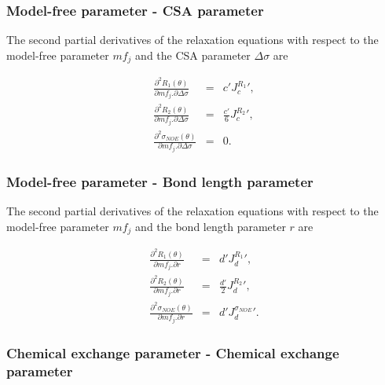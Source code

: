\subsubsection{Model-free parameter - CSA parameter}

The second partial derivatives of the relaxation equations with respect to the model-free parameter $mf_j$ and the CSA parameter $\Delta\sigma$ are

\begin{eqnarray}
    \frac{\partial^2 R_1(\theta)}{\partial mf_j . \partial \Delta\sigma} & = & c' {J_c^{R_1}}',             \label{eq: Ri': d2R1/dmfj.dCSA} \\
    \frac{\partial^2 R_2(\theta)}{\partial mf_j . \partial \Delta\sigma} & = & \frac{c'}{6} {J_c^{R_2}}',   \label{eq: Ri': d2R2/dmfj.dCSA} \\
    \frac{\partial^2 \sigma_{NOE}(\theta)}{\partial mf_j . \partial \Delta\sigma} & = & 0.                  \label{eq: Ri': d2sigmaNOE/dmfj.dCSA}
\end{eqnarray}


\subsubsection{Model-free parameter - Bond length parameter}

The second partial derivatives of the relaxation equations with respect to the model-free parameter $mf_j$ and the bond length parameter $r$ are

\begin{eqnarray}
    \frac{\partial^2 R_1(\theta)}{\partial mf_j . \partial r} & = & d' {J_d^{R_1}}',                    \label{eq: Ri': d2R1/dmfj.dr} \\
    \frac{\partial^2 R_2(\theta)}{\partial mf_j . \partial r} & = & \frac{d'}{2} {J_d^{R_2}}',          \label{eq: Ri': d2R2/dmfj.dr} \\
    \frac{\partial^2 \sigma_{NOE}(\theta)}{\partial mf_j . \partial r} & = & d' {J_d^{\sigma_{NOE}}}'.  \label{eq: Ri': d2sigmaNOE/dmfj.dr}
\end{eqnarray}


\subsubsection{Chemical exchange parameter - Chemical exchange parameter}

